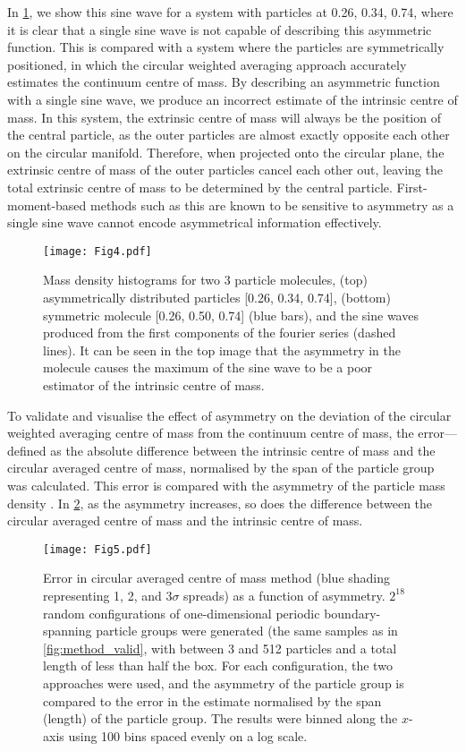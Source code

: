 \documentclass[reprint,superscriptaddress,nobibnotes,amsmath,amssymb,aip]{revtex4-2}
\begin{document}
In \cref{fig:sine_wave_assym}, we show this sine wave for a system with particles at 0.26,  0.34, 0.74, where it is clear that a single sine wave is not capable of describing this asymmetric function. 
This is compared with a system where the particles are symmetrically positioned, in which the circular weighted averaging approach accurately estimates the continuum centre of mass. 
By describing an asymmetric function with a single sine wave, we produce an incorrect estimate of the intrinsic centre of mass. 
In this system, the extrinsic centre of mass will always be the position of the central particle, as the outer particles are almost exactly opposite each other on the circular manifold.
Therefore, when projected onto the circular plane, the extrinsic centre of mass of the outer particles cancel each other out, leaving the total extrinsic centre of mass to be determined by the central particle. 
First-moment-based methods such as this are known to be sensitive to asymmetry \cite{teague_robust_2018} as a single sine wave cannot encode asymmetrical information effectively. 
%
\begin{figure}
    \centering
    \texttt{[image: Fig4.pdf]}
    \caption{Mass density histograms for two 3 particle molecules, (top) asymmetrically distributed particles [0.26, 0.34, 0.74], (bottom) symmetric molecule [0.26, 0.50, 0.74] (blue bars), and the sine waves produced from the first components of the fourier series (dashed lines). It can be seen in the top image that the asymmetry in the molecule causes the maximum of the sine wave to be a poor estimator of the intrinsic centre of mass. }
    \label{fig:sine_wave_assym}
\end{figure}
%

To validate and visualise the effect of asymmetry on the deviation of the circular weighted averaging centre of mass from the continuum centre of mass, the error—defined as the absolute difference between the intrinsic centre of mass and the circular averaged centre of mass, normalised by the span of the particle group was calculated.
This error is compared with the asymmetry of the particle mass density \cite{xioajun_on_1991}. 
In \cref{fig:method_comparison}, as the asymmetry increases, so does the difference between the circular averaged centre of mass and the intrinsic centre of mass. 
%
\begin{figure}
    \centering
    \texttt{[image: Fig5.pdf]}
    \caption{Error in circular averaged centre of mass method (blue shading representing 1, 2, and 3$\sigma$ spreads) as a function of asymmetry.
    $2^{18}$ random configurations of one-dimensional periodic boundary-spanning particle groups were generated (the same samples as in \cref{fig:method_valid}, with between 3 and 512 particles and a total length of less than half the box. 
    For each configuration, the two approaches were used, and the asymmetry of the particle group\cite{xioajun_on_1991} is compared to the error in the estimate normalised by the span (length) of the particle group. 
    The results were binned along the $x$-axis using 100 bins spaced evenly on a log scale.}
    \label{fig:method_comparison}
\end{figure}
\end{document}
